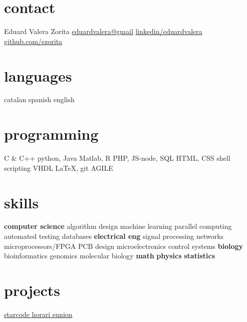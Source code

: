 \documentclass[]{friggeri-cv} %
\begin{document}



\begin{aside} %
  \section{contact}
  {\FA \faUser}
  Eduard Valera Zorita
  {\FA \faEnvelope}
  \href{mailto:eduardvalera@gmail.com}{eduardvalera@gmail}
  {\FA \faLinkedinSign}
  \href{http://www.linkedin.com/in/eduardvalera}{linkedin/eduardvalera}
  {\FA \faGithubSign}
  \href{http://github.com/ezorita}{github.com/ezorita}
  \section{languages}
  catalan
  spanish
  english
  \section{programming}
  C \& C++
  python, Java
  Matlab, R
  PHP, JS-node, SQL
  HTML, CSS
  shell scripting
  VHDL
  \LaTeX, git
  AGILE
  \section{skills}
  {\bf computer science}
  algorithm design
  machine learning
  parallel computing
  automated testing
  databases
  {\bf electrical eng}
  signal processing
  networks
  microprocessors/FPGA
  PCB design
  microelectronics
  control systems
  {\bf biology}
  bioinformatics
  genomics
  molecular biology
  {\bf math}
  {\bf physics}
  {\bf statistics}
  \section{projects}
  \href{http://github.com/gui11aume/starcode}{starcode {\FA \faExternalLink}}
  \href{http://horari.sunion.cat}{horari sunion {\FA \faExternalLink}}
\end{aside}

\end{document}

